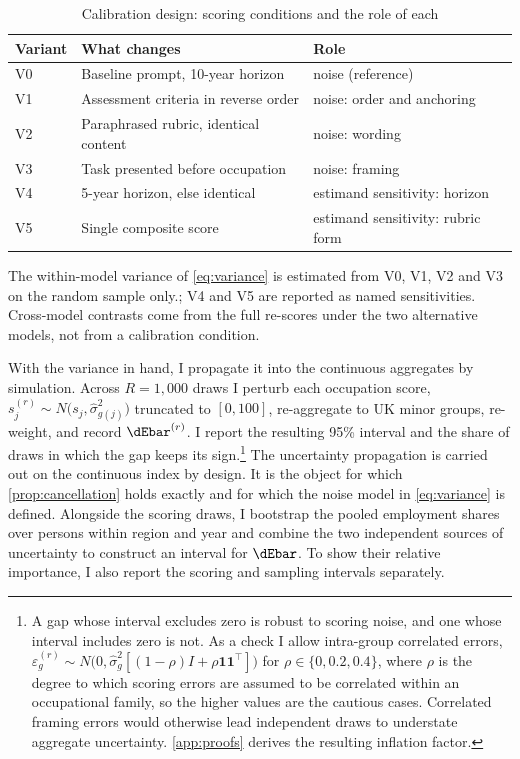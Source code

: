 \begin{table}[t]
\centering
\caption{Calibration design: scoring conditions and the role of each}
\label{tab:calibration}
\small
\begin{tabular}{lll}
\toprule
Variant & What changes & Role \\
\midrule
V0 & Baseline prompt, 10-year horizon & noise (reference) \\
V1 & Assessment criteria in reverse order & noise: order and anchoring \\
V2 & Paraphrased rubric, identical content & noise: wording \\
V3 & Task presented before occupation & noise: framing \\
V4 & 5-year horizon, else identical & estimand sensitivity: horizon \\
V5 & Single composite score & estimand sensitivity: rubric form \\
\bottomrule
\end{tabular}
\begin{minipage}{0.92\textwidth}
\vspace{0.4em}\footnotesize
The within-model variance of \cref{eq:variance} is estimated from V0, V1, V2 and V3 on the random sample only.; V4 and V5 are reported as named sensitivities. Cross-model contrasts come from the full re-scores under the two alternative models, not from a calibration condition.
\end{minipage}
\end{table}

With the variance in hand, I propagate it into the continuous aggregates by simulation. Across $R = 1{,}000$ draws I perturb each occupation score, $s^{(r)}_j \sim N\bigl(s_j, \widehat{\sigma}^2_{g(j)}\bigr)$ truncated to $[0,100]$, re-aggregate to UK minor groups, re-weight, and record $\dEbar^{(r)}$. I report the resulting 95\% interval and the share of draws in which the gap keeps its sign.\footnote{A gap whose interval excludes zero is robust to scoring noise, and one whose interval includes zero is not. As a check I allow intra-group correlated errors, $\varepsilon^{(r)}_g \sim N\bigl(0, \widehat{\sigma}^2_g [(1-\rho)I + \rho \bm{1}\bm{1}^{\top}]\bigr)$ for $\rho \in \{0, 0.2, 0.4\}$, where $\rho$ is the degree to which scoring errors are assumed to be correlated within an occupational family, so the higher values are the cautious cases. Correlated framing errors would otherwise lead independent draws to understate aggregate uncertainty. \cref{app:proofs} derives the resulting inflation factor.} The uncertainty propagation is carried out on the continuous index by design. It is the object for which \cref{prop:cancellation} holds exactly and for which the noise model in \cref{eq:variance} is defined. Alongside the scoring draws, I bootstrap the pooled employment shares over persons within region and year and combine the two independent sources of uncertainty to construct an interval for $\dEbar$. To show their relative importance, I also report the scoring and sampling intervals separately.

